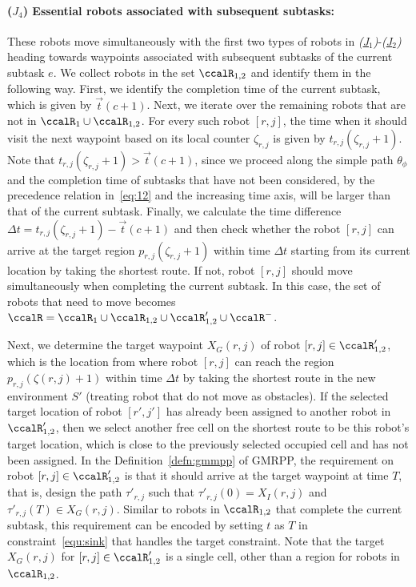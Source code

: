 \documentclass[Afour,sageh,times]{sagej}
\begin{document}
{ \paragraph{($J_4$) Essential robots associated with subsequent subtasks:} These robots move simultaneously with the first two types of robots in {\it (\hyperref[sec:essential_a]{J$_1$})}-{\it (\hyperref[sec:essential_b]{J$_2$})} heading towards  waypoints associated with subsequent subtasks of the current subtask $e$. We collect robots in the set $\ccalR_{1,2}$ and identify them in the following way. First, we identify the completion time  of the current subtask, which is given by $\vec{t}(c+1)$.  Next, we iterate over the remaining robots that are not in $\ccalR_1 \cup \ccalR_{1,2}$. For every such robot $[r,j]$, the time when it should visit the next waypoint based on its local counter $\zeta_{r,j}$ is given by $t_{r,j}(\zeta_{r,j}+1)$. Note that {$t_{r, j}(\zeta_{r,j}+1) > \vec{t}(c+1)$}, since we proceed along the simple path $\theta_{\phi}$ and the completion time of  subtasks that have not been considered, by the precedence relation in~\eqref{eq:12} and the increasing time axis, will be larger than that of the current subtask. Finally, we calculate the time difference $\Delta t = t_{r, j}(\zeta_{r,j}+1) - \vec{t}(c+1)$  and then check whether the robot $[r, j]$ can arrive at the target region $p_{r,j}(\zeta_{r,j}+1)$  within time $\Delta t$ starting from  its current location by taking the shortest route. {If not, robot $[r, j]$ should move simultaneously when completing the current subtask.} In this case, the set of robots that need to move becomes $\ccalR = \ccalR_1 \cup \ccalR_{1,2} \cup \ccalR'_{1,2}\cup \ccalR^-$.

 Next, we determine the target waypoint $X_G(r,j)$ of robot $[r,j] \in \ccalR'_{1,2}$, which is the  location from where robot $[r,j]$ can reach the region $p_{r,j}(\zeta(r,j)+1)$ within time $\Delta t$ by taking the shortest route in the new environment $S'$ (treating robot that do not move as obstacles). If the selected target location of robot $[r',j']$ has already been assigned to another robot in $\ccalR'_{1,2}$, then we select another free cell on the shortest route to be this robot's target location, which is close to the previously selected occupied cell and has not been assigned. In the Definition~\ref{defn:gmmpp} of GMRPP, the requirement on robot $[r,j] \in \ccalR'_{1,2}$ is that it should arrive at the target waypoint at time $T$, that is, design the path $\tau'_{r,j}$ such that $\tau'_{r,j}(0) = X_I(r,j)$ and $\tau'_{r,j}(T) \in X_G(r,j)$.  Similar to robots in $\ccalR_{1,2}$ that complete the current subtask, this requirement can be encoded by setting $t$ as $T$ in constraint~\eqref{equ:sink} that handles the target constraint. Note that the target $X_G(r,j)$ for $[r,j] \in \ccalR_{1,2}'$ is a single cell, other than a region for robots in $\ccalR_{1,2}$.

}
\end{document}
